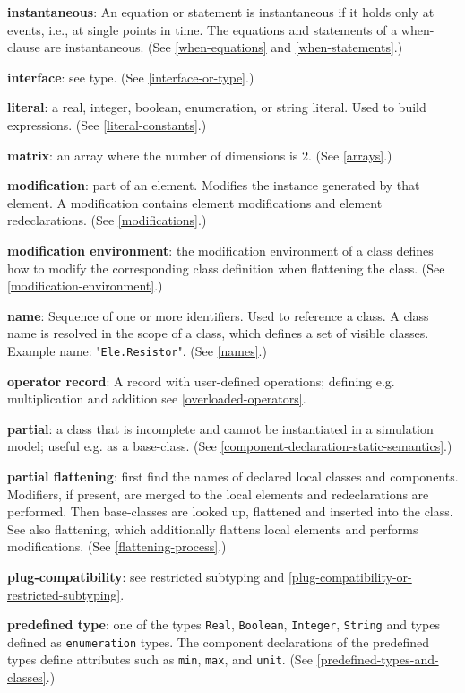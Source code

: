 \textbf{instantaneous}: An equation or statement is instantaneous if it
holds only at events, i.e., at single points in time. The equations and
statements of a when-clause are instantaneous. (See \autoref{when-equations} and
\autoref{when-statements}.)

\textbf{interface}: see type. (See \autoref{interface-or-type}.)

\textbf{literal}: a real, integer, boolean, enumeration, or string
literal. Used to build expressions. (See \autoref{literal-constants}.)

\textbf{matrix}: an array where the number of dimensions is 2. (See
\autoref{arrays}.)

\textbf{modification}: part of an element. Modifies the instance
generated by that element. A modification contains element modifications
and element redeclarations. (See \autoref{modifications}.)

\textbf{modification environment}: the modification environment of a
class defines how to modify the corresponding class definition when
flattening the class. (See \autoref{modification-environment}.)

\textbf{name}: Sequence of one or more identifiers. Used to reference a
class. A class name is resolved in the scope of a class, which defines a
set of visible classes. Example name: "\lstinline!Ele.Resistor!". (See \autoref{names}.)

\textbf{operator record}: A record with user-defined operations;
defining e.g. multiplication and addition see \autoref{overloaded-operators}.

\textbf{partial}: a class that is incomplete and cannot be instantiated
in a simulation model; useful e.g. as a base-class. (See \autoref{component-declaration-static-semantics}.)

\textbf{partial flattening}: first find the names of declared local
classes and components. Modifiers, if present, are merged to the local
elements and redeclarations are performed. Then base-classes are looked
up, flattened and inserted into the class. See also flattening, which
additionally flattens local elements and performs modifications. (See
\autoref{flattening-process}.)

\textbf{plug-compatibility}: see restricted subtyping and \autoref{plug-compatibility-or-restricted-subtyping}.

\textbf{predefined type}: one of the types \lstinline!Real!, \lstinline!Boolean!, \lstinline!Integer!,
\lstinline!String! and types defined as \lstinline!enumeration! types. The component
declarations of the predefined types define attributes such as \lstinline!min!, \lstinline!max!,
and \lstinline!unit!. (See \autoref{predefined-types-and-classes}.)

